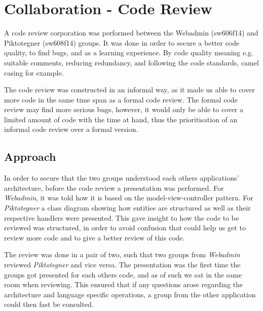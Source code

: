 \chapter{Collaboration - Code Review}
A code review corporation was performed between the Webadmin (sw606f14) and Piktotegner (sw608f14) groups.
It was done in order to secure a better code quality, to find bugs, and as a learning experience.
By code quality meaning e.g. suitable comments, reducing redundancy, and following the code standards, camel casing for example.

The code review was constructed in an informal way, as it made us able to cover more code in the same time span as a formal code review.
The formal code review may find more serious bugs, however, it would only be able to cover a limited amount of code with the time at hand, thus the prioritisation of an informal code review over a formal version.


\section*{Approach}
In order to secure that the two groups understood each others applications' architecture, before the code review a presentation was performed. 
For \textit{Webadmin}, it was told how it is based on the model-view-controller pattern.
For \textit{Piktotegner} a class diagram showing how entities are structured as well as their respective handlers were presented.
This gave insight to how the code to be reviewed was structured, in order to avoid confusion that could help us get to review more code and to give a better review of this code.

The review was done in a pair of two, such that two groups from \textit{Webadmin} reviewed \textit{Piktotegner} and vice versa.
The presentation was the first time the groups got presented for each others code, and as of such we sat in the same room when reviewing.
This ensured that if any questions arose regarding the architecture and language specific operations, a group from the other application could then fast be consulted.

